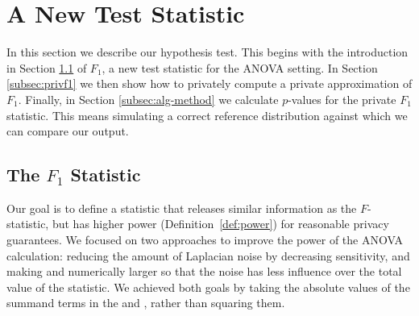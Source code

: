 
\section{A New Test Statistic}\label{sec:f1}

In this section we describe our hypothesis test.  This begins with the introduction in Section \ref{subsec:f1def} of $F_1$, a new test statistic for the ANOVA setting.  In Section \ref{subsec:privf1} we then show how to privately compute a private approximation of $F_1$.  Finally, in Section \ref{subsec:alg-method} we calculate $p$-values for the private $F_1$ statistic.  This means simulating a correct reference distribution against which we can compare our output.


\subsection{The $F_1$ Statistic}\label{subsec:f1def}


Our goal is to define a statistic that releases similar information as the $F$-statistic, but has higher power (Definition~\ref{def:power}) for reasonable privacy guarantees.  We focused on two approaches to improve the power of the ANOVA calculation: reducing the amount of Laplacian noise by decreasing sensitivity, and making \ssa and \sse numerically larger so that the noise has less influence over the total value of the statistic.  We achieved both goals by taking the absolute values of the summand terms in the \ssa and \sse, rather than squaring them. 

